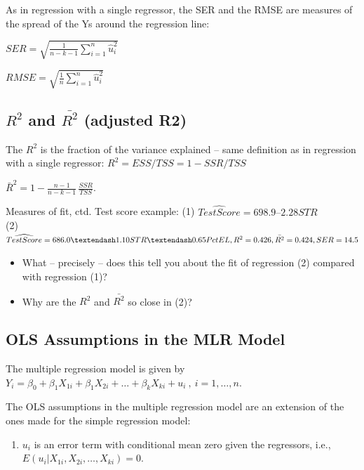 \documentclass[
  letterpaper,
  DIV=11,
  numbers=noendperiod]{scrartcl}
\providecommand{\tightlist}{%
  \setlength{\itemsep}{0pt}\setlength{\parskip}{0pt}}\usepackage{longtable,booktabs,array}
\begin{document}
As in regression with a single regressor, the SER and the RMSE are
measures of the spread of the Ys around the regression line:

\(SER = \sqrt {\frac{1}{n-k-1} \sum_{i = 1}^n \hat{u}^2_i}\)

\(RMSE = \sqrt {\frac{1}{n} \sum_{i = 1}^n \hat{u}^2_i}\)

\hypertarget{r2-and-barr2-adjusted-r2}{%
\subsection{\texorpdfstring{\(R^2\) and \(\bar{R^2}\) (adjusted
R2)}{R\^{}2 and \textbackslash bar\{R\^{}2\} (adjusted R2)}}\label{r2-and-barr2-adjusted-r2}}

The \(R^2\) is the fraction of the variance explained -- same definition
as in regression with a single regressor:
\(R^2 = {ESS/TSS}=1-{SSR/TSS}\)

\(\bar{R}^2 = 1-\frac{n-1}{n-k-1} \, \frac{SSR}{TSS}.\)

Measures of fit, ctd. Test score example: (1)
\(\widehat{TestScore}= 698.9 – 2.28STR\)\\
(2)
\(\widehat{TestScore} = 686.0 – 1.10STR – 0.65PctEL,\\R^2=0.426, \bar{R^2}=0.424, SER=14.5\)

\begin{itemize}
\tightlist
\item
  What -- precisely -- does this tell you about the fit of regression
  (2) compared with regression (1)?
\item
  Why are the \(R^2\) and \(\bar{R^2}\) so close in (2)?
\end{itemize}

\hypertarget{ols-assumptions-in-the-mlr-model}{%
\subsection{OLS Assumptions in the MLR
Model}\label{ols-assumptions-in-the-mlr-model}}

The multiple regression model is given by
\(Y_i = \beta_0 + \beta_1 X_{1i} + \beta_1 X_{2i} + \dots + \beta_k X_{ki} + u_i \ , \ i=1,\dots,n.\)

The OLS assumptions in the multiple regression model are an extension of
the ones made for the simple regression model:

\begin{enumerate}
\def\labelenumi{\arabic{enumi}.}
\tightlist
\item
  \(u_i\) is an error term with conditional mean zero given the
  regressors, i.e., \(E(u_i\vert X_{1i}, X_{2i}, \dots, X_{ki}) = 0.\)
\end{enumerate}
\end{document}
